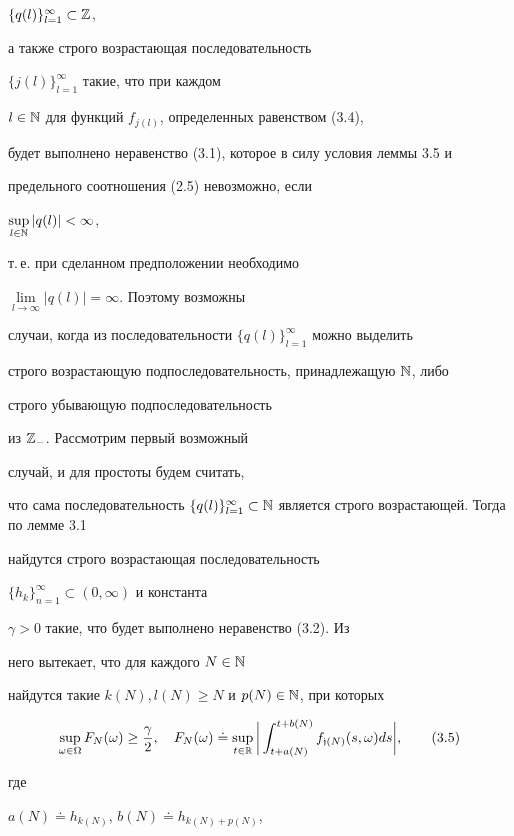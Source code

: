 $\{q(l)\}_{l=1}^{\infty}\subset \Bbb Z$,


а также строго возрастающая последовательность


$\{j(l)\}_{l=1}^{\infty}$ такие, что при каждом


$l\in\Bbb N$ для функций $f_{j(l)}$, определенных равенством (3.4),


будет выполнено неравенство (3.1), которое в силу условия леммы 3.5 и


предельного соотношения (2.5) невозможно, если


$\sup\limits_{l\in \Bbb N}|q(l)|<\infty$,


т.\,е. при  сделанном предположении необходимо


$\lim\limits_{l\to\infty}|q(l)|=\infty$. Поэтому возможны


случаи, когда из последовательности $\{q(l)\}_{l=1}^{\infty}$ можно выделить


строго возрастающую подпоследовательность, принадлежащую $\Bbb N$, либо


строго убывающую подпоследовательность


из $\Bbb Z_-$. Рассмотрим первый возможный


случай, и для простоты будем считать,


что сама последовательность $\{q(l)\}_{l=1}^{\infty}\subset


\Bbb N$ является строго возрастающей. Тогда по лемме 3.1


найдутся строго возрастающая последовательность


$\{h_k\}_{n=1}^{\infty}\subset(0,\infty)$ и константа


$\gamma>0$ такие, что будет выполнено неравенство (3.2). Из


него вытекает, что для каждого $N\in \Bbb N$


найдутся такие $k(N), l(N)\ge N$ и $p(N)\in\Bbb N$, при которых


\begin{equation}


\sup_{\mm}F_{N}(\omega)\ge \frac{\gamma}{2},\quad


F_{N}(\omega)\doteq


\sup\limits_{t\in\Bbb R}\bigg|\int_{t+a(N)}^{t+b(N)}


f_{\frak j(N)}(s,\omega)ds\bigg|,\tag{3.5}


\end{equation}


где


$a(N)\doteq h_{k(N)}$, $b(N)\doteq h_{k(N)+p(N)}$,


